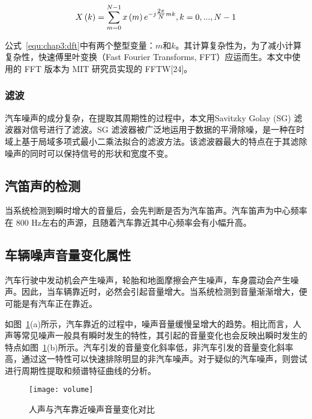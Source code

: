 \begin{equation}
\label{equ:chap3:dft}
X\left( k \right) = \sum\limits_{m = 0}^{N - 1} {x\left( m \right){e^{ - j{\textstyle{{2\pi } \over N}}mk}},k = 0,...,N - 1}
\end{equation}


公式~\ref{equ:chap3:dft}中有两个整型变量：$m$和$k$。其计算复杂性为，为了减小计算复杂性，快速傅里叶变换（Fast Fourier Transforms, FFT）应运而生。本文中使用的 FFT 版本为 MIT 研究员实现的 FFTW[24]。

\subsubsection{滤波}

汽车噪声的成分复杂，在提取其周期性的过程中，本文用Savitzky Golay (SG) 滤波器对信号进行了滤波。SG 滤波器被广泛地运用于数据的平滑除噪，是一种在时域上基于局域多项式最小二乘法拟合的滤波方法。该滤波器最大的特点在于其滤除噪声的同时可以保持信号的形状和宽度不变。

\subsection{汽笛声的检测}

当系统检测到瞬时增大的音量后，会先判断是否为汽车笛声。汽车笛声为中心频率在 800 Hz左右的声源，且随着汽车靠近其中心频率会有小幅升高。

\subsection{车辆噪声音量变化属性}

汽车行驶中发动机会产生噪声，轮胎和地面摩擦会产生噪声，车身震动会产生噪声。因此，当车辆靠近时，必然会引起音量增大。当系统检测到音量渐渐增大，便可能是有汽车正在靠近。


如图~\ref{fig:volume}(a)所示，汽车靠近的过程中，噪声音量缓慢呈增大的趋势。相比而言，人声等常见噪声一般具有瞬时发生的特性，其引起的音量变化也会反映出瞬时发生的特点如图~\ref{fig:volume}(b)所示。汽车引发的音量变化斜率低，非汽车引发的音量变化斜率高，通过这一特性可以快速排除明显的非汽车噪声。对于疑似的汽车噪声，则尝试进行周期性提取和频谱特征曲线的分析。

\begin{figure}[htbp] %
  \centering
  \texttt{[image: volume]}
  \caption[音量变化特性对比]{人声与汽车靠近噪声音量变化对比}
  \label{fig:volume}
\end{figure}


